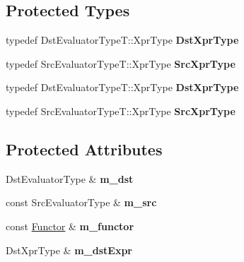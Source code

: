 \subsection*{Protected Types}
\begin{DoxyCompactItemize}
\item 
\mbox{\label{class_eigen_1_1internal_1_1generic__dense__assignment__kernel_af8e9503cf14af5b67c678cc7908554a9}} 
typedef Dst\+Evaluator\+Type\+T\+::\+Xpr\+Type {\bfseries Dst\+Xpr\+Type}
\item 
\mbox{\label{class_eigen_1_1internal_1_1generic__dense__assignment__kernel_ad41c9cdbb78e6c5e7371dd694a907d0d}} 
typedef Src\+Evaluator\+Type\+T\+::\+Xpr\+Type {\bfseries Src\+Xpr\+Type}
\item 
\mbox{\label{class_eigen_1_1internal_1_1generic__dense__assignment__kernel_af8e9503cf14af5b67c678cc7908554a9}} 
typedef Dst\+Evaluator\+Type\+T\+::\+Xpr\+Type {\bfseries Dst\+Xpr\+Type}
\item 
\mbox{\label{class_eigen_1_1internal_1_1generic__dense__assignment__kernel_ad41c9cdbb78e6c5e7371dd694a907d0d}} 
typedef Src\+Evaluator\+Type\+T\+::\+Xpr\+Type {\bfseries Src\+Xpr\+Type}
\end{DoxyCompactItemize}
\subsection*{Protected Attributes}
\begin{DoxyCompactItemize}
\item 
\mbox{\label{class_eigen_1_1internal_1_1generic__dense__assignment__kernel_ac1720df7c1c66bb4eb513b4f3284af5b}} 
Dst\+Evaluator\+Type \& {\bfseries m\+\_\+dst}
\item 
\mbox{\label{class_eigen_1_1internal_1_1generic__dense__assignment__kernel_a12c661e350a5c6bf4c04a94917ec8e50}} 
const Src\+Evaluator\+Type \& {\bfseries m\+\_\+src}
\item 
\mbox{\label{class_eigen_1_1internal_1_1generic__dense__assignment__kernel_a7b1605b397d6f32e6bc4c90eb7bc5d90}} 
const \hyperlink{struct_functor}{Functor} \& {\bfseries m\+\_\+functor}
\item 
\mbox{\label{class_eigen_1_1internal_1_1generic__dense__assignment__kernel_adef77cada2e6be5bf44bba5835c09943}} 
Dst\+Xpr\+Type \& {\bfseries m\+\_\+dst\+Expr}
\end{DoxyCompactItemize}


